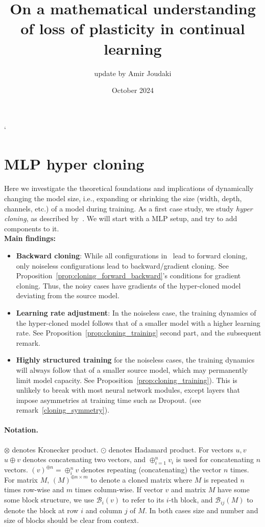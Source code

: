 \documentclass{article}
\title{On a mathematical understanding of loss of plasticity in continual learning}
\author{update by Amir Joudaki}
\date{October 2024}
\newcommand{\1}{\mathbf{1}}
\newcommand{\R}[2]{\mathcal{R}_{#2}(#1)}
\renewcommand{\R}[2]{({#1})^{\oplus #2}}
\newcommand{\bl}[2]{\mathcal{B}_{#2}({#1})}
\begin{document}
`
\maketitle


\section{MLP hyper cloning}
Here we investigate the theoretical
foundations and implications of dynamically changing the model size, i.e., expanding or shrinking the size (width, depth, channels, etc.) of a model during training. As a first case study, we study \textit{hyper cloning}, as described by~\citet{samragh2024scaling}. We will start with a MLP setup, and try to add components to it.
\\

\textbf{Main findings:}
\begin{itemize}
    \item \textbf{Backward cloning}: While all configurations in~\citet{samragh2024scaling} lead to forward cloning, only noiseless configurations lead to backward/gradient cloning. See Proposition~\ref{prop:cloning_forward_backward}'s conditions for gradient cloning. Thus, the noisy cases have gradients of the hyper-cloned model deviating from the source model. 
    \item \textbf{Learning rate adjustment}: In the noiseless case, the training dynamics of the hyper-cloned model follows that of a smaller model with a higher learning rate. See Proposition~\ref{prop:cloning_training} second part, and the subsequent remark. 
    \item \textbf{Highly structured training} for the noiseless cases, the training dynamics will always follow that of a smaller source model, which may permanently limit model capacity. See Proposition~\ref{prop:cloning_training}). This is unlikely to break with most neural network modules, except layers that impose asymmetries at training time such as Dropout. (see remark~\ref{cloning_symmetry}). 
\end{itemize}


\paragraph{Notation.} 
$\otimes $ denotes Kronecker product. $\odot$ denotes Hadamard product.
For vectors $u,v$ $u\oplus v $ denotes concatenating two vectors, and $\oplus_{i=1}^n v_i$ is used for concatenating $n$ vectors.
$\R{v}{n}=\oplus_i^n v$ denotes repeating (concatenating) the vector $n$ times. For matrix $M$, $\R{M}{n\times m}$ to denote a cloned matrix where $M$ is repeated $n$ times row-wise and $m$ times column-wise. If vector $v$ and matrix $M$ have some some block structure, we use $\bl{v}{i}$ to refer to its $i$-th block, and $\bl{M}{ij}$ to denote the block at row $i$ and column $j$ of $M.$ In both cases size and number and size of blocks should be clear from context. 
\newpage 
\end{document}
